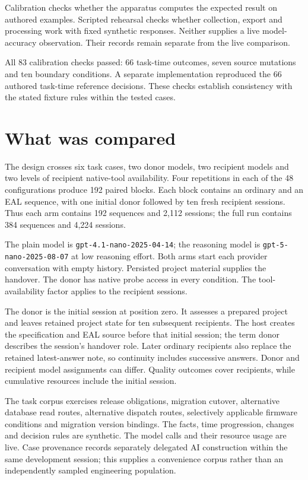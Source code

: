 \documentclass[preprint,11pt]{elsarticle}
\begin{document}
Calibration checks whether the apparatus computes the expected result on
authored examples. Scripted rehearsal checks whether collection, export
and processing work with fixed synthetic responses. Neither supplies a
live model-accuracy observation. Their records remain separate from the
live comparison.

All 83 calibration checks passed: 66 task-time outcomes, seven source
mutations and ten boundary conditions. A separate implementation
reproduced the 66 authored task-time reference decisions. These checks
establish consistency with the stated fixture rules within the tested
cases.

\FloatBarrier

\hypertarget{what-was-compared}{%
\section{What was compared}\label{what-was-compared}}

The design crosses six task cases, two donor models, two recipient
models and two levels of recipient native-tool availability. Four
repetitions in each of the 48 configurations produce 192 paired blocks.
Each block contains an ordinary and an EAL sequence, with one initial
donor followed by ten fresh recipient sessions. Thus each arm contains
192 sequences and 2,112 sessions; the full run contains 384 sequences
and 4,224 sessions.

The plain model is \nolinkurl{gpt-4.1-nano-2025-04-14}; the reasoning model
is \nolinkurl{gpt-5-nano-2025-08-07} at low reasoning effort. Both arms
start each provider conversation with empty history. Persisted project
material supplies the handover. The donor has native probe access in
every condition. The tool-availability factor applies to the recipient
sessions.

The donor is the initial session at position zero. It assesses a
prepared project and leaves retained project state for ten subsequent
recipients. The host creates the specification and EAL source before
that initial session; the term donor describes the session's handover
role. Later ordinary recipients also replace the retained latest-answer
note, so continuity includes successive answers. Donor and recipient
model assignments can differ. Quality outcomes cover recipients, while
cumulative resources include the initial session.

The task corpus exercises release obligations, migration cutover,
alternative database read routes, alternative dispatch routes,
selectively applicable firmware conditions and migration version
bindings. The facts, time progression, changes and decision rules are
synthetic. The model calls and their resource usage are live. Case
provenance records separately delegated AI construction within the same
development session; this supplies a convenience corpus rather than an
independently sampled engineering population.
\end{document}
